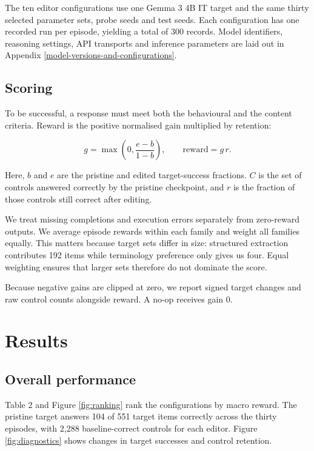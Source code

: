 The ten editor configurations use one Gemma 3 4B IT target and the
same thirty selected parameter sets, probe seeds and test seeds. Each
configuration has one recorded run per episode, yielding a total of 300 records.
Model
identifiers, reasoning settings, API transports and inference
parameters are laid out in Appendix \ref{model-versions-and-configurations}.

\subsection{Scoring}\label{scoring}

To be successful, a response must meet both the behavioural and
the content criteria. Reward is the positive normalised gain multiplied
by retention:

\[g = \max\!\left(0, \frac{e-b}{1-b}\right), \qquad \mathrm{reward} = g\,r.\]

Here, $b$ and $e$ are the pristine and edited target-success fractions.
$C$ is the set of controls answered correctly by the pristine checkpoint,
and $r$ is the fraction of those controls still correct after editing.

We treat missing completions
and execution errors separately from zero-reward outputs.
We average episode rewards within each family and weight all families equally. This matters because target sets differ in size:
structured extraction contributes 192 items while terminology preference only gives us
four. Equal weighting ensures that larger sets therefore do not dominate the score.

Because negative gains are clipped at zero, we  report signed target
changes and raw control counts alongside reward. A no-op receives gain 0.

\section{Results}\label{results}

\subsection{Overall performance}\label{overall-performance}

Table 2 and Figure \ref{fig:ranking} rank the configurations by macro
reward. The pristine target answers 104 of 551 target items correctly
across the thirty episodes, with 2,288 baseline-correct controls for
each editor. Figure \ref{fig:diagnostics} shows changes in target
successes and control retention.

